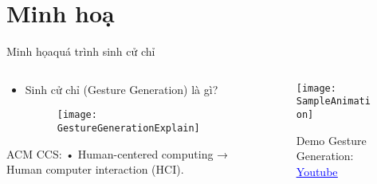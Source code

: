 \section{Minh hoạ}

\begin{frame}{Minh họaquá trình sinh cử chỉ}
	\vspace{10pt}
	\begin{columns}
		\begin{column}{0.7\textwidth}
			\begin{itemize}
				\item Sinh cử chỉ (Gesture Generation) là gì?
				
				\begin{figure}[h]
					\centering
					\texttt{[image: GestureGenerationExplain]}
				\end{figure}
			
			\end{itemize}
			ACM CCS: • Human-centered computing → Human computer interaction (HCI).
			
		\end{column}
		\begin{column}{0.3\textwidth} %
			\begin{figure}[h]
			\centering
			\texttt{[image: SampleAnimation]}
			
				
			{
			\small Demo Gesture Generation: \href{https://www.youtube.com/watch?v=B6nv1kQmi-Q}{\textcolor{blue}{\uline{Youtube}}}
			}
			\end{figure}
		\end{column}
	\end{columns}
\end{frame}

